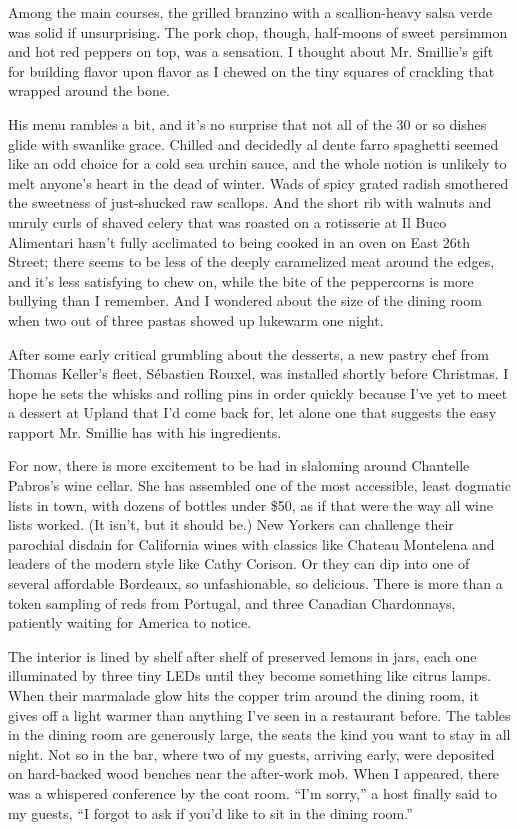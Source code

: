 Among the main courses, the grilled branzino with a scallion-heavy salsa
verde was solid if unsurprising. The pork chop, though, half-moons of
sweet persimmon and hot red peppers on top, was a sensation. I thought
about Mr. Smillie's gift for building flavor upon flavor as I chewed on
the tiny squares of crackling that wrapped around the bone.

His menu rambles a bit, and it's no surprise that not all of the 30 or
so dishes glide with swanlike grace. Chilled and decidedly al dente
farro spaghetti seemed like an odd choice for a cold sea urchin sauce,
and the whole notion is unlikely to melt anyone's heart in the dead of
winter. Wads of spicy grated radish smothered the sweetness of
just-shucked raw scallops. And the short rib with walnuts and unruly
curls of shaved celery that was roasted on a rotisserie at Il Buco
Alimentari hasn't fully acclimated to being cooked in an oven on East
26th Street; there seems to be less of the deeply caramelized meat
around the edges, and it's less satisfying to chew on, while the bite of
the peppercorns is more bullying than I remember. And I wondered about
the size of the dining room when two out of three pastas showed up
lukewarm one night.

After some early critical grumbling about the desserts, a new pastry
chef from Thomas Keller's fleet, Sébastien Rouxel, was installed shortly
before Christmas. I hope he sets the whisks and rolling pins in order
quickly because I've yet to meet a dessert at Upland that I'd come back
for, let alone one that suggests the easy rapport Mr. Smillie has with
his ingredients.

For now, there is more excitement to be had in slaloming around
Chantelle Pabros's wine cellar. She has assembled one of the most
accessible, least dogmatic lists in town, with dozens of bottles under
\$50, as if that were the way all wine lists worked. (It isn't, but it
should be.) New Yorkers can challenge their parochial disdain for
California wines with classics like Chateau Montelena and leaders of the
modern style like Cathy Corison. Or they can dip into one of several
affordable Bordeaux, so unfashionable, so delicious. There is more than
a token sampling of reds from Portugal, and three Canadian Chardonnays,
patiently waiting for America to notice.

The interior is lined by shelf after shelf of preserved lemons in jars,
each one illuminated by three tiny LEDs until they become something like
citrus lamps. When their marmalade glow hits the copper trim around the
dining room, it gives off a light warmer than anything I've seen in a
restaurant before. The tables in the dining room are generously large,
the seats the kind you want to stay in all night. Not so in the bar,
where two of my guests, arriving early, were deposited on hard-backed
wood benches near the after-work mob. When I appeared, there was a
whispered conference by the coat room. ``I'm sorry,'' a host finally
said to my guests, ``I forgot to ask if you'd like to sit in the dining
room.''

